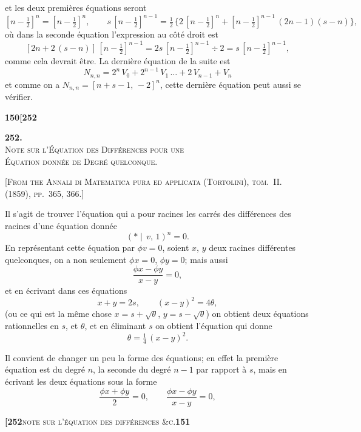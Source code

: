 \documentclass[11pt]{article}
\newcommand{\Cdel}{\mid}
\begin{document}
et les deux premières équations seront
\[
[n - \tfrac{1}{2}]^{n} = [n - \tfrac{1}{2}]^{n},\qquad s\,[n - \tfrac{1}{2}]^{n-1} = \tfrac{1}{2}\,\{2\,[n - \tfrac{1}{2}]^{n} + [n - \tfrac{1}{2}]^{n-1}\,(2n - 1)(s - n)\},
\]
où dans la seconde équation l'expression au côté droit est
\[
[2n + 2\,(s - n)]\,[n - \tfrac{1}{2}]^{n-1} = 2s\,[n - \tfrac{1}{2}]^{n-1} \div 2 = s\,[n - \tfrac{1}{2}]^{n-1},
\]
comme cela devrait être. La dernière équation de la suite est
\[
N_{n,n} = 2^{n}\,V_0 + 2^{n-1}\,V_1\,\ldots + 2\,V_{n-1} + V_n
\]
et comme on a $N_{n,n} = [n + s - 1,\,-2]^{n}$, cette dernière équation peut aussi se vérifier.

\newpage

\noindent\textbf{150}\hfill\hfill\textbf{[252}

\medskip

\begin{center}
\textbf{252.}\\[0.6em]
{\Large\textsc{Note sur l'Équation des Différences pour une\\Équation donnée de Degré quelconque.}}
\end{center}

\medskip

\textsc{[From the Annali di Matematica pura ed applicata (Tortolini), tom.~II. (1859), pp.~365, 366.]}

\medskip

Il s'agit de trouver l'équation qui a pour racines les carrés des différences des racines d'une équation donnée
\[
(*\!\Cdel\,v,\,1)^{n} = 0.
\]
En représentant cette équation par $\phi v = 0$, soient $x$, $y$ deux racines différentes quelconques, on a non seulement $\phi x = 0$, $\phi y = 0$; mais aussi
\[
\frac{\phi x - \phi y}{x - y} = 0,
\]
et en écrivant dans ces équations
\[
x + y = 2s,\qquad (x - y)^2 = 4\theta,
\]
(ou ce qui est la même chose $x = s + \sqrt{\theta}$, $y = s - \sqrt{\theta}$) on obtient deux équations rationnelles en $s$, et $\theta$, et en éliminant $s$ on obtient l'équation qui donne
\[
\theta = \tfrac{1}{4}\,(x - y)^2.
\]

Il convient de changer un peu la forme des équations; en effet la première équation est du degré $n$, la seconde du degré $n - 1$ par rapport à $s$, mais en écrivant les deux équations sous la forme
\[
\frac{\phi x + \phi y}{2} = 0,\qquad \frac{\phi x - \phi y}{x - y} = 0,
\]

\newpage

\noindent\textbf{[252}\hfill\textsc{note sur l'équation des différences \&c.}\hfill\textbf{151}
\end{document}
